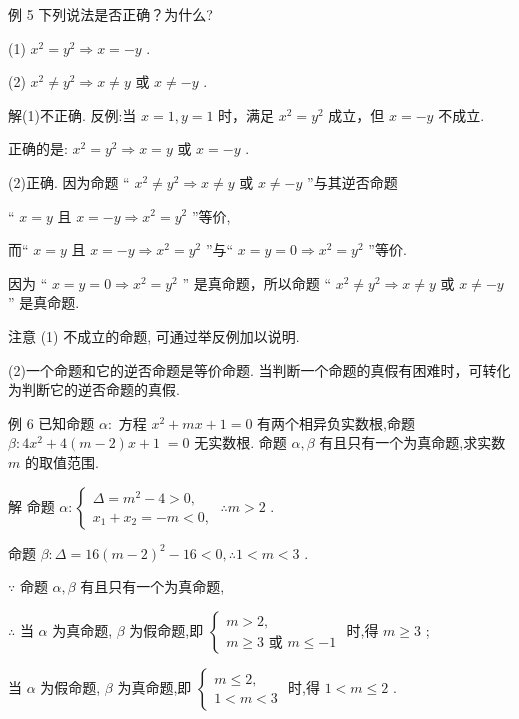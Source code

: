 \documentclass[10pt]{article}
\begin{document}
例 5 下列说法是否正确？为什么?

(1) \({x}^{2} = {y}^{2} \Rightarrow  x =  - y\) .

(2) \({x}^{2} \neq  {y}^{2} \Rightarrow  x \neq  y\) 或 \(x \neq   - y\) .

解(1)不正确. 反例:当 \(x = 1,y = 1\) 时，满足 \({x}^{2} = {y}^{2}\) 成立，但 \(x =  - y\) 不成立.

正确的是: \({x}^{2} = {y}^{2} \Rightarrow  x = y\) 或 \(x =  - y\) .

(2)正确. 因为命题 “ \({x}^{2} \neq  {y}^{2} \Rightarrow  x \neq  y\) 或 \(x \neq   - y\) ”与其逆否命题

“ \(x = y\) 且 \(x =  - y \Rightarrow  {x}^{2} = {y}^{2}\) ”等价,

而“ \(x = y\) 且 \(x =  - y \Rightarrow  {x}^{2} = {y}^{2}\) ”与“ \(x = y = 0 \Rightarrow  {x}^{2} = {y}^{2}\) ”等价.

因为 “ \(x = y = 0 \Rightarrow  {x}^{2} = {y}^{2}\) ” 是真命题，所以命题 “ \({x}^{2} \neq  {y}^{2} \Rightarrow  x \neq  y\) 或 \(x \neq   - y\) ” 是真命题.

注意 (1) 不成立的命题, 可通过举反例加以说明.

(2)一个命题和它的逆否命题是等价命题. 当判断一个命题的真假有困难时，可转化为判断它的逆否命题的真假.

例 6 已知命题 \(\alpha  :\) 方程 \({x}^{2} + {mx} + 1 = 0\) 有两个相异负实数根,命题 \(\beta  : 4{x}^{2} + 4\left( {m - 2}\right) x + 1 \; = 0\) 无实数根. 命题 \(\alpha ,\beta\) 有且只有一个为真命题,求实数 \(m\) 的取值范围.

解 命题 \(\alpha  : \left\{  {\begin{array}{l} \Delta  = {m}^{2} - 4 > 0, \\  {x}_{1} + {x}_{2} =  - m < 0, \end{array}\;\therefore m > 2}\right.\) .

命题 \(\beta  : \Delta  = {16}{\left( m - 2\right) }^{2} - {16} < 0,\therefore 1 < m < 3\) .

\(\because\) 命题 \(\alpha ,\beta\) 有且只有一个为真命题,

\(\therefore\) 当 \(\alpha\) 为真命题, \(\beta\) 为假命题,即 \(\left\{  \begin{array}{l} m > 2, \\  m \geq  3\text{ 或 }m \leq   - 1 \end{array}\right.\) 时,得 \(m \geq  3\) ;

当 \(\alpha\) 为假命题, \(\beta\) 为真命题,即 \(\left\{  \begin{array}{l} m \leq  2, \\  1 < m < 3 \end{array}\right.\) 时,得 \(1 < m \leq  2\) .
\end{document}
